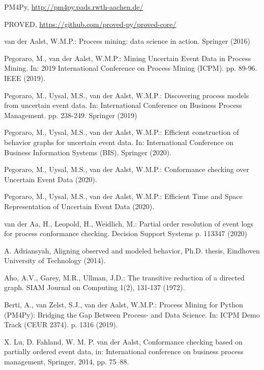 \documentclass[a4paper,11pt,twoside]{pads-thesis}
\begin{document}
% 
%
\begin{thebibliography}{5}

PM4Py, \url{http://pm4py.pads.rwth-aachen.de/}

PROVED, \url{https://github.com/proved-py/proved-core/}

van der Aalst, W.M.P.: Process mining: data science in action. Springer (2016)

Pegoraro, M., van der Aalst, W.M.P.: Mining Uncertain Event Data in Process Mining. In: 2019 International Conference on Process Mining (ICPM). pp. 89-96. IEEE (2019).

Pegoraro, M., Uysal, M.S., van der Aalst, W.M.P.: Discovering process models from uncertain event data. In: International Conference on Business Process Management. pp. 238-249. Springer (2019)

Pegoraro, M., Uysal, M.S., van der Aalst, W.M.P.: Efficient construction of behavior graphs for uncertain event data. In: International Conference on Business Information Systems (BIS). Springer (2020).

Pegoraro, M., Uysal, M.S., van der Aalst, W.M.P.: Conformance checking over Uncertain Event Data (2020).

Pegoraro, M., Uysal, M.S., van der Aalst, W.M.P.: Efficient Time and Space Representation of Uncertain Event Data (2020). 

van der Aa, H., Leopold, H., Weidlich, M.: Partial order resolution of event logs for process conformance checking. Decision Support Systems p. 113347 (2020)

A. Adriansyah, Aligning observed and modeled behavior, Ph.D. thesis, Eindhoven University of Technology (2014).

Aho, A.V., Garey, M.R., Ullman, J.D.: The transitive reduction of a directed graph.
SIAM Journal on Computing 1(2), 131-137 (1972).

Berti, A., van Zelst, S.J., van der Aalst, W.M.P.: Process Mining for Python (PM4Py): Bridging the Gap Between Process- and Data Science. In: ICPM Demo Track (CEUR 2374). p. 1316 (2019).

X. Lu, D. Fahland, W. M. P. van der Aalst, Conformance checking based on partially ordered event data, in: International conference on business process management, Springer, 2014, pp. 75–88.


\end{thebibliography}
\end{document}
